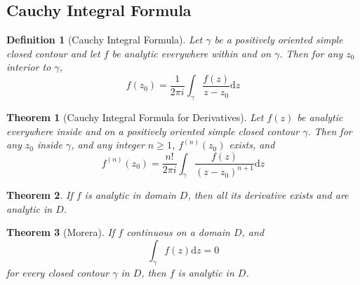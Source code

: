 \documentclass[12pt]{article}
\newcommand{\diff}{\mathrm{d}}
\newtheorem{definition}{Definition}[section]
\newtheorem{theorem}{Theorem}[section]
\theoremstyle{definition}
\begin{document}
\subsection{Cauchy Integral Formula}
\begin{definition}[Cauchy Integral Formula]
\normalfont Let $\gamma$ be a positively oriented simple closed contour and let $f$ be analytic everywhere within and on $\gamma$. Then for any $z_0$ interior to $\gamma$,
\[
f(z_0)=\frac{1}{2\pi i}\int_{\gamma}\frac{f(z)}{z-z_0}\diff z
\]
\end{definition}
\begin{theorem}[Cauchy Integral Formula for Derivatives]
\normalfont Let $f(z)$ be analytic everywhere inside and on a positively oriented simple closed contour $\gamma$. Then for any $z_0$ inside $\gamma$, and any integer $n\geq 1$, $f^{(n)}(z_0)$ exists, and
\[
f^{(n)}(z_0)=\frac{n!}{2\pi i}\int_{\gamma}\frac{f(z)}{(z-z_0)^{n+1}}\diff z
\]
\end{theorem}
\begin{theorem}\normalfont If $f$ is analytic in domain $D$, then all its derivative exists and are analytic in $D$.
\end{theorem}
\begin{theorem}[Morera]
\normalfont If $f$ continuous on a domain $D$, and
\[
\int_{\gamma}f(z)\diff z = 0
\]
for every closed contour $\gamma$ in $D$, then $f$ is analytic in $D$.
\end{theorem}
\end{document}
